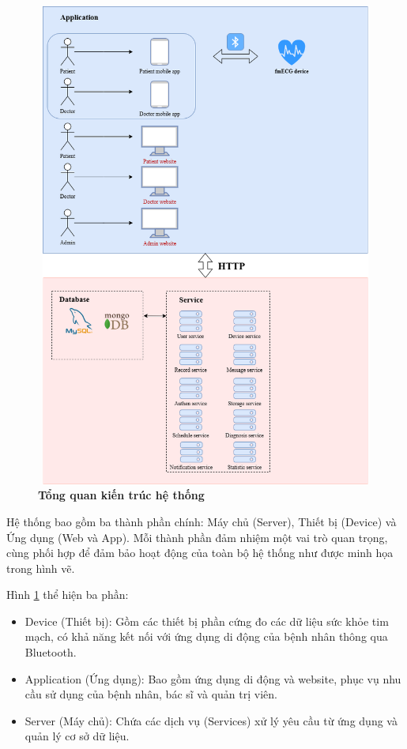 \begin{figure}[H]
	\centering
	\includegraphics[width=12cm,height=16cm]{Images/System/fmECG_architecture-System_Architecture.drawio.png}
	\caption[Tổng quan kiến trúc hệ thống]{\bfseries \fontsize{12pt}{0pt}\selectfont Tổng quan kiến trúc hệ thống}
	\label{fmECG_architecture-System} %
\end{figure}
Hệ thống bao gồm ba thành phần chính: Máy chủ (Server), Thiết bị (Device) và Ứng dụng (Web và App).
Mỗi thành phần đảm nhiệm một vai trò quan trọng, cùng phối hợp để đảm bảo hoạt động của toàn bộ hệ thống như được minh họa trong hình vẽ.

Hình \ref{fmECG_architecture-System} thể hiện ba phần:

\begin{adjustwidth}{1.5em}{}
	\begin{itemize}
		\item Device (Thiết bị): Gồm các thiết bị phần cứng đo các dữ liệu sức khỏe tim mạch, có khả năng kết nối với ứng dụng di động của bệnh nhân thông qua Bluetooth.
		\item Application (Ứng dụng): Bao gồm ứng dụng di động và website, phục vụ nhu cầu sử dụng của bệnh nhân, bác sĩ và quản trị viên.
		\item Server (Máy chủ): Chứa các dịch vụ (Services) xử lý yêu cầu từ ứng dụng và quản lý cơ sở dữ liệu.
	\end{itemize}
\end{adjustwidth}


